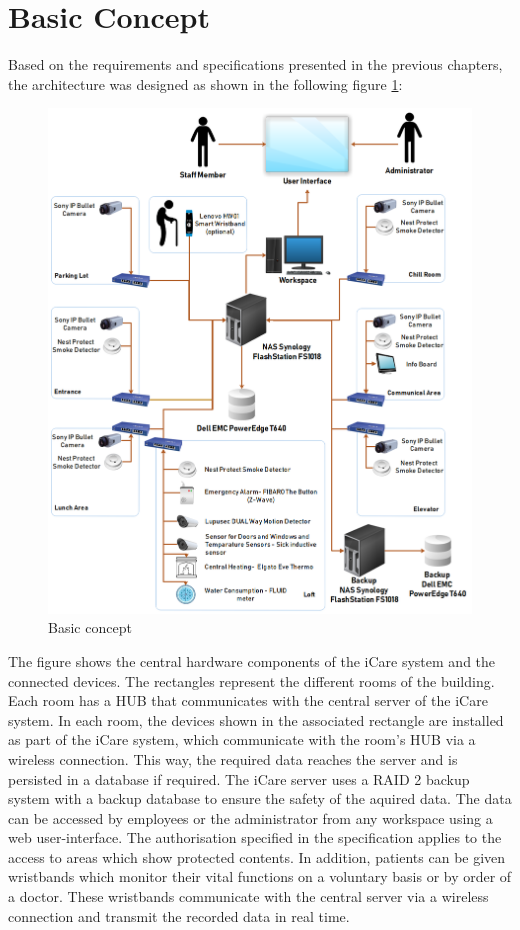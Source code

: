 \section{Basic Concept}
\label{basic-concept}
Based on the requirements and specifications presented in the previous chapters, the architecture was designed as shown in the following figure \ref{architecure}:
\begin{figure}[H]
	\centering
	\includegraphics[width =1.0\textwidth]{images/architecture.PNG}
	\caption{Basic concept}
	\label{architecure}
\end{figure}
The figure shows the central hardware components of the iCare system and the connected devices. The rectangles represent the different rooms of the building. Each room has a HUB that communicates with the central server of the iCare system. In each room, the devices shown in the associated rectangle are installed as part of the iCare system, which communicate with the room's HUB via a wireless connection. This way, the required data reaches the server and is persisted in a database if required. The iCare server uses a RAID 2 backup system with a backup database to ensure the safety of the aquired data. The data can be accessed by employees or the administrator from any workspace using a web user-interface. The authorisation specified in the specification applies to the access to areas which show protected contents. In addition, patients can be given wristbands which monitor their vital functions on a voluntary basis or by order of a doctor. These wristbands communicate with the central server via a wireless connection and transmit the recorded data in real time.